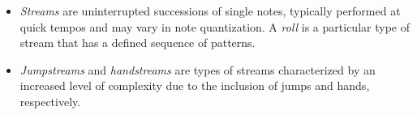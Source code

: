 \begin{itemize}
	\item \textit{Streams} are uninterrupted successions of single notes, typically performed at quick tempos and may vary in note quantization. A \textit{roll} is a particular type of stream that has a defined sequence of patterns.
	      
	\item \textit{Jumpstreams} and \textit{handstreams} are types of streams characterized by an increased level of complexity due to the inclusion of jumps and hands, respectively.
	      
	      
	      
\end{itemize}

